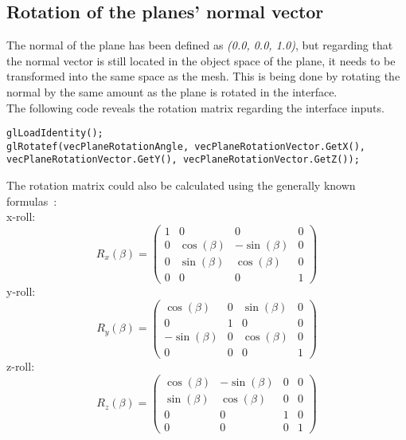 \subsection{Rotation of the planes' normal vector}
The normal of the plane has been defined as \emph{(0.0, 0.0, 1.0)}, but regarding that the normal vector is still located in the object space of the plane, it needs to be transformed into the same space as the mesh. This is being done by rotating the normal by the same amount as the plane is rotated in the interface.\\
The following code reveals the rotation matrix regarding the interface inputs.
\begin{lstlisting}
glLoadIdentity();
glRotatef(vecPlaneRotationAngle, vecPlaneRotationVector.GetX(), vecPlaneRotationVector.GetY(), vecPlaneRotationVector.GetZ());
\end{lstlisting}
The rotation matrix could also be calculated using the generally known formulas~\cite{book:computerGraphicsHill}:\\ %
\newline
x-roll:
\begin{equation}
R_{x}(\beta) = 
\begin{pmatrix} 
	1 & 0 & 0 & 0 \\ 
	0 & \cos(\beta) & -\sin(\beta) & 0 \\ 
	0 & \sin(\beta) & \cos(\beta) & 0 \\ 
	0 & 0 & 0 & 1 
\end{pmatrix}
\end{equation}
\newline
y-roll:\\
\begin{equation}
R_{y}(\beta) =
\begin{pmatrix} 
	\cos(\beta) & 0 & \sin(\beta) & 0 \\
	0 & 1 & 0 & 0 \\
	-\sin(\beta) & 0 & \cos(\beta) & 0 \\
	0 & 0 & 0 & 1
\end{pmatrix}
\end{equation}
\newline
z-roll:\\
\begin{equation}
R_{z}(\beta) =
\begin{pmatrix} 
	\cos(\beta) & -\sin(\beta) & 0 & 0 \\
	\sin(\beta) & \cos(\beta) & 0 & 0 \\
	0 & 0 & 1 & 0 \\
	0 & 0 & 0 & 1
\end{pmatrix}
\end{equation}
